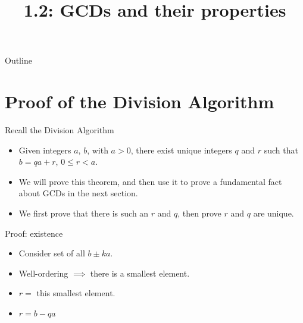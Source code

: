 \documentclass{beamer}
\title[GCDs] %
{1.2: GCDs and their properties}
\begin{document}
\begin{frame}
  \titlepage
\end{frame}

\begin{frame}{Outline}
  \tableofcontents
\end{frame}




\section{Proof of the Division Algorithm}

\begin{frame}{Recall the Division Algorithm}

  \begin{itemize}
  \item Given integers $a$, $b$, with $a > 0$, there exist unique integers $q$
    and $r$ such that $b = qa + r$, $0 \le r < a$.

  \item  We will prove this theorem, and then use it to prove a fundamental
  fact about GCDs in the next section.

  \item  We first prove that there is such an $r$ and $q$, then prove
    $r$ and $q$ are unique.

  \end{itemize}

\end{frame}

\begin{frame}{Proof: existence}
  \begin{itemize}
  \item Consider set of all $b \pm ka$.
  \item Well-ordering $\implies$ there is a smallest element.
  \item $r = $ this smallest element.
  \item $r = b -qa$
  \end{itemize}
\end{frame}
\end{document}
